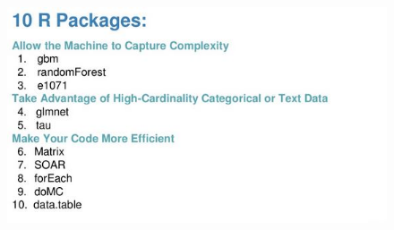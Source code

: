 \documentclass{beamer}
\begin{document}
\begin{frame}
	\begin{figure}
		\centering
		\includegraphics[width=1.05\linewidth]{tenpackintro03}
		
	\end{figure}
	
\end{frame}
\end{document}
